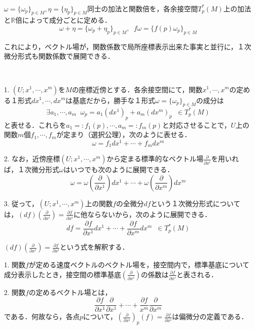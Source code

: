 \documentclass[uplatex, dvipdfmx]{jsreport}
\begin{document}
\begin{definition}[１形式上の演算]　

    $\omega=\{\omega_p\}_{p\in M}, \eta=\{\eta_p\}_{p\in M}$同士の加法と関数倍を，各余接空間$T_p^*(M)$上の加法と$\mathbb{R}$倍によって成分ごとに定める．
    \[\omega+\eta =\{\omega_p+\eta_p\}_{p\in M},\;\; f\omega =\{f(p)\omega_p\}_{p\in M}\]
\end{definition}
これにより，ベクトル場が，関数係数で局所座標表示出来た事実と並行に，１次微分形式も関数係数で展開できる．
\begin{definition}[１次微分形式の局所座標表示]　

    1. $(U;x^1,\cdots,x^m)$を$M$の座標近傍とする．各余接空間にて，関数$x^1,\cdots,x^m$の定める１形式$dx^1,\cdots,dx^m$は基底だから，勝手な１形式$\omega=\{\omega_p\}_{p\in M}$の成分は
    \[\exists a_1,\cdots,a_m\;\; \omega_p=a_1(dx^1)_p+a_m(dx^m)_p\;\;\in T_p^*(M)\]
    と表せる．これらを$a_1=:f_1(p),\cdots,a_m=:f_m(p)$と対応させることで，$U$上の関数$m$個$f_1,\cdots,f_m$が定まり（選択公理），次のように表せる．
    \[ \omega=f_1dx^1+\cdots+f_mdx^m\]

    2. なお，近傍座標$(U;x^1,\cdots,x^m)$から定まる標準的なベクトル場$\frac{\partial}{\partial x^i}$を用いれば，１次微分形式$\omega$はいつでも次のように展開できる．
    \[ \omega=\omega\left(\frac{\partial}{\partial x^1}\right)dx^1+\cdots+\omega\left(\frac{\partial}{\partial x^m}\right)dx^m\]

    3. 従って，$(U;x^1,\cdots,x^m)$上の関数$f$の全微分$df$という１次微分形式については，$(df)\left(\frac{\partial}{\partial x^i}\right)=\frac{\partial f}{\partial x^i}$に他ならないから，次のように展開できる．
    \[ df=\frac{\partial f}{\partial x^1}dx^1+\cdots +\frac{\partial f}{\partial x^m}dx^m\;\;\in T_p^*(M) \]
\end{definition}
\begin{remark}
    $(df)\left(\frac{\partial}{\partial x^i}\right)=\frac{\partial f}{\partial x^i}$という式を解釈する．
    
    1. 関数$f$が定める速度ベクトルのベクトル場を，接空間内で，標準基底について成分表示したとき，接空間の標準基底$\left(\frac{\partial}{\partial x^i}\right)$の係数は$\frac{\partial f}{\partial x^i}$と表される．

    2. 関数$f$の定めるベクトル場とは，
    \[\frac{\partial f}{\partial x^1}\frac{\partial}{\partial x^1}+\cdots +\frac{\partial f}{x^m}\frac{\partial}{\partial x^m}\]
    である．何故なら，各点$p$について，$\left(\frac{\partial}{\partial x^i}\right)_p (f)=\frac{\partial f}{\partial x^i}$は偏微分の定義である．
\end{remark}
\end{document}
